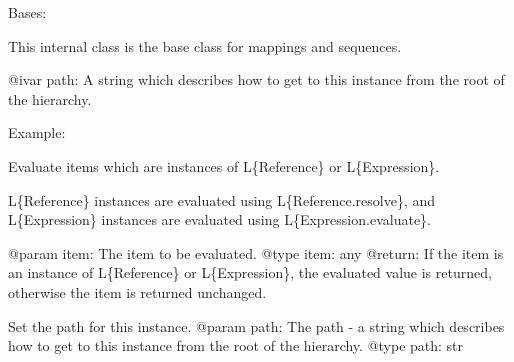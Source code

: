 \documentclass[a4paper,10pt,english]{sphinxmanual}
\begin{document}
\begin{fulllineitems}
\label{\detokenize{commands/apidoc/src:src.pyconf.Container}}
Bases: 

This internal class is the base class for mappings and sequences.

@ivar path: A string which describes how to get
to this instance from the root of the hierarchy.

Example:

%
\begin{sphinxVerbatim}[commandchars=\\\{\}]
\PYG{p}{[}\PYG{p}{]}\PYG{p}{[}\PYG{p}{]}
\end{sphinxVerbatim}

\begin{fulllineitems}
\label{\detokenize{commands/apidoc/src:src.pyconf.Container.evaluate}}
Evaluate items which are instances of L\{Reference\} or L\{Expression\}.

L\{Reference\} instances are evaluated using L\{Reference.resolve\},
and L\{Expression\} instances are evaluated using
L\{Expression.evaluate\}.

@param item: The item to be evaluated.
@type item: any
@return: If the item is an instance of L\{Reference\} or L\{Expression\},
the evaluated value is returned, otherwise the item is returned
unchanged.

\end{fulllineitems}


\begin{fulllineitems}
\label{\detokenize{commands/apidoc/src:src.pyconf.Container.setPath}}
Set the path for this instance.
@param path: The path - a string which describes how to get
to this instance from the root of the hierarchy.
@type path: str

\end{fulllineitems}


\end{fulllineitems}
\end{document}
